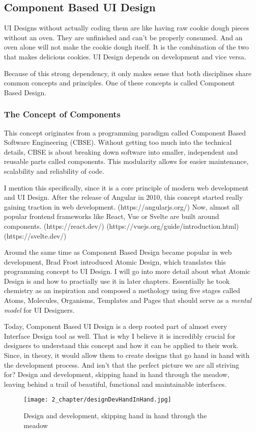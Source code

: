 \newpage
\subsection{Component Based UI Design}
UI Designs without actually coding them are like having raw cookie dough pieces without an oven.
They are unfinished and can't be properly consumed. And an oven alone will not make the cookie dough
itself. It is the combination of the two that makes delicious cookies. UI Design depends on
development and vice versa.

Because of this strong dependency, it only makes sense that both disciplines share common concepts
and principles. One of these concepts is called Component Based Design.

\subsubsection{The Concept of Components}
This concept originates from a programming paradigm called Component Based Software Engineering
(CBSE). Without getting too much into the technical details, CBSE is about breaking down software
into smaller, independent and reusable parts called components. This modularity allows for easier
maintenance, scalability and reliability of code.

I mention this specifically, since it is a core principle of modern web development and UI Design.
After the release of Angular in 2010, this concept started really gaining traction in web development.
(https://angularjs.org/)
Now, almost all popular frontend frameworks like React, Vue or Svelte are built around components.
(https://react.dev/) (https://vuejs.org/guide/introduction.html) (https://svelte.dev/)

Around the same time as Component Based Design became popular in web development, Brad Frost
introduced Atomic Design, which translates this programming concept to UI Design. I will go into
more detail about what Atomic Design is and how to practially use it in later chapters. Essentially
he took chemistry as an inspiration and composed a methology using five stages called Atoms,
Molecules, Organisms, Templates and Pages that should serve as a \textit{mental model} for UI
Designers. 

Today, Component Based UI Design is a deep rooted part of almost every Interface Design tool as
well. That is why I believe it is incredibly crucial for designers to understand this concept and
how it can be applied to their work. Since, in theory, it would allow them to create designs that go
hand in hand with the development process. And isn't that the perfect picture we are all striving
for? Design and development, skipping hand in hand through the meadow, leaving behind a trail of
beautiful, functional and maintainable interfaces.

\begin{figure}[]
    \begin{center}
        \texttt{[image: 2\_chapter/designDevHandInHand.jpg]}
        \caption[Caption (url)]{Design and development, skipping hand in hand through the meadow}
    \end{center}
\end{figure}

